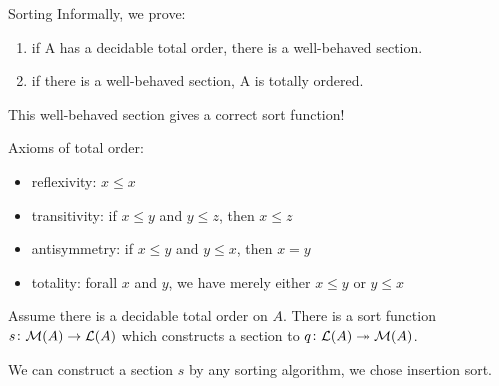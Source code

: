 \documentclass[9pt]{beamer}
\begin{document}
\begin{frame}{Sorting}
Informally, we prove:
\begin{enumerate}
    \item if A has a decidable total order, there is a well-behaved section.
    \item if there is a well-behaved section, A is totally ordered.
\end{enumerate}

This \alert{well-behaved section} gives a \alert{correct sort function}!

Axioms of \alert{total order}:
\begin{itemize}
    \item reflexivity: $x \leq x$
    \item transitivity: if $x \leq y$ and $y \leq z$, then $x \leq z$
    \item antisymmetry: if $x \leq y$ and $y \leq x$, then $x = y$
    \item totality: forall $x$ and $y$, we have \alert{merely} either $x \leq y$ or $y \leq x$ 
\end{itemize}

\begin{pblock}
    Assume there is a decidable total order on $A$.
    There is a sort function $s\colon \mathcal{M}(A) \to \mathcal{L}(A)$ which constructs a section to $q\colon \mathcal{L}(A) \twoheadrightarrow \mathcal{M}(A)$.
\end{pblock}

We can construct a section $s$ by any sorting algorithm, we chose \alert{insertion sort}.

\end{frame}
\end{document}
